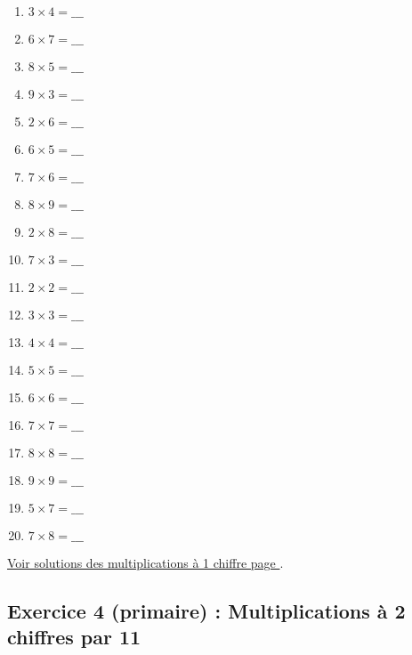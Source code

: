 \begin{enumerate}[label=C\arabic*)]
    \item \(3\times 4 = \_\_\_\)
    \item \(6\times 7 = \_\_\_\)
    \item \(8\times 5 = \_\_\_\)
    \item \(9\times 3 = \_\_\_\)
    \item \(2\times 6 = \_\_\_\)
    \item \(6\times 5 = \_\_\_\)
    \item \(7\times 6 = \_\_\_\)
    \item \(8\times 9 = \_\_\_\)
    \item \(2\times 8 = \_\_\_\)
    \item \(7\times 3 = \_\_\_\)
    \item \(2\times 2 = \_\_\_\)
    \item \(3\times 3 = \_\_\_\)
    \item \(4\times 4 = \_\_\_\)
    \item \(5\times 5 = \_\_\_\)
    \item \(6\times 6 = \_\_\_\)
    \item \(7\times 7 = \_\_\_\)
    \item \(8\times 8 = \_\_\_\)
    \item \(9\times 9 = \_\_\_\)
    \item \(5\times 7 = \_\_\_\)
    \item \(7\times 8 = \_\_\_\)
\end{enumerate}

\hyperref[sol:niveau3]{Voir solutions des multiplications à 1 chiffre page \pageref{sol:niveau3}}.

\newpage


\subsection{Exercice 4 (primaire) : Multiplications à 2 chiffres par 11}


\label{calc:niveau4}


